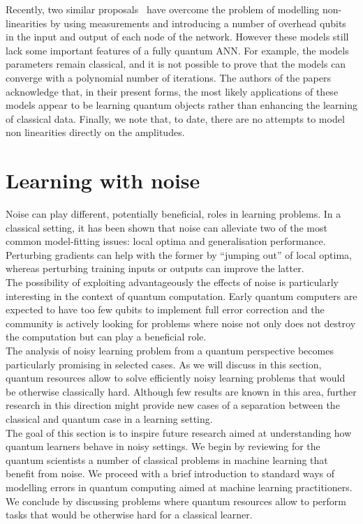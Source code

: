 \documentclass[a4paper, 11pt]{article}
\begin{document}
Recently, two similar proposals~\cite{wan2016quantum, romero2016quantum} have overcome the problem of modelling non-linearities by using measurements and introducing a number of overhead qubits in the input and output of each node of the network. However these models still lack some important features of a fully quantum ANN. For example, the models parameters remain classical, and it is not possible to prove that the models can converge with a polynomial number of iterations. The authors of the papers acknowledge that, in their present forms, the most likely applications of these models appear to be learning quantum objects rather than enhancing the learning of classical data. Finally, we note that, to date, there are no attempts to model non linearities directly on the amplitudes.\\

\section{Learning with noise}
\label{sec:noise}

Noise can play different, potentially beneficial, roles in learning problems.
In a classical setting, it has been shown that noise can alleviate two of the most common model-fitting issues: local optima and generalisation performance. Perturbing gradients can help with the former by ``jumping out'' of local optima, whereas perturbing training inputs or outputs can improve the latter.\\

The possibility of exploiting advantageously the effects of noise is particularly interesting in the context of quantum computation. Early quantum computers are expected to have too few qubits to implement full error correction and the community is actively looking for problems where noise not only does not destroy the computation but can play a beneficial role. \\

The analysis of noisy learning problem from a quantum perspective becomes particularly promising in selected cases. As we will discuss in this section, quantum resources allow to solve efficiently noisy learning problems that would be otherwise classically hard. Although few results are known in this area, further research in this direction might provide new cases of a separation between the classical and quantum case in a learning setting.\\

The goal of this section is to inspire future research aimed at understanding how quantum learners behave in noisy settings. We begin by reviewing for the quantum scientists a number of classical problems in machine learning that benefit from noise. We proceed with a brief introduction to standard ways of modelling errors in quantum computing aimed at machine learning practitioners. We conclude by discussing problems where quantum resources allow to perform tasks that would be otherwise hard for a classical learner. 
\end{document}
